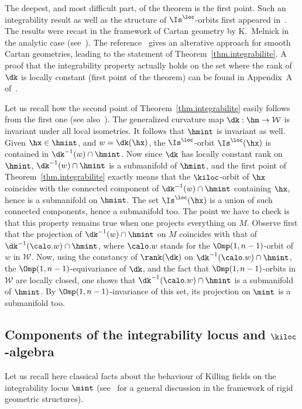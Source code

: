 The deepest, and most difficult part, of the theorem is the first point. Such an integrability result as well as the structure of $\Is^{\loc}$-orbits first appeared in~\cite{gromov}. The results were recast in the framework of Cartan geometry by K.~Melnick in the analytic case (see~\cite{melnick}). The reference~\cite{vincent} gives an alterative approach for smooth Cartan geometries, leading to the statement of Theorem~\ref{thm.integrabilite}. A proof that the integrability property actually holds on the set where the rank of $\dk$ is locally constant (first point of the theorem) can be found in Appendix~A of~\cite{frances.open}.


Let us recall how the second point of Theorem~\ref{thm.integrabilite} easily follows from the first one (see also~\cite[Section~4.3.2]{vincent}). The generalized curvature map $\dk: \hm \to {\mathcal W}$ is invariant under all local isometries. It follows that $\hmint$ is invariant as well. Given $\hx \in \hmint$, and $w=\dk(\hx)$, the $\Is^{\loc}$-orbit $\Is^{\loc}(\hx)$ is contained in $\dk^{-1}(w) \cap \hmint$. Now since $\dk$ has locally constant rank on $\hmint$, $\dk^{-1}(w) \cap \hmint$ is a submanifold of $\hmint$, and the first point of Theorem~\ref{thm.integrabilite} exactly means that the $\kiloc$-orbit of $\hx$ coincides with the connected component of $\dk^{-1}(w) \cap \hmint$ containing $\hx$, hence is a submanifold on $\hmint$. The set $\Is^{\loc}(\hx)$ is a union of such connected components, hence a submanifold too. The point we have to check is that this property remains true when one projects everything on $M$. Observe first that the projection of $\dk^{-1}(w) \cap \hmint$ on $M$ coincides with that of $\dk^{-1}({\calo }.w) \cap \hmint$, where ${\calo}.w$ stands for the $\Omp(1,n-1)$-orbit of $w$ in ${\mathcal W}$. Now, using the constancy of $\rank(\dk)$ on $ \dk^{-1}({\calo }.w) \cap \hmint$, the $\Omp(1,n-1)$-equivariance of $\dk$, and the fact that $\Omp(1,n-1)$-orbits in ${\mathcal W}$ are locally closed, one shows that $\dk^{-1}({\calo }.w) \cap \hmint$ is a submanifold of $\hmint$. By $\Omp(1,n-1)$-invariance of this set, its projection on $\mint$ is a submanifold too.


\subsection{Components of the integrability locus and \texorpdfstring{$\kiloc$}{kiloc}-algebra}\label{sec.intlocus}
Let us recall here classical facts about the behaviour of Killing fields on the integrability locus $\mint$ (see~\cite[Section~5.15]{dambragro} for a general discussion in the framework of rigid geometric structures).

